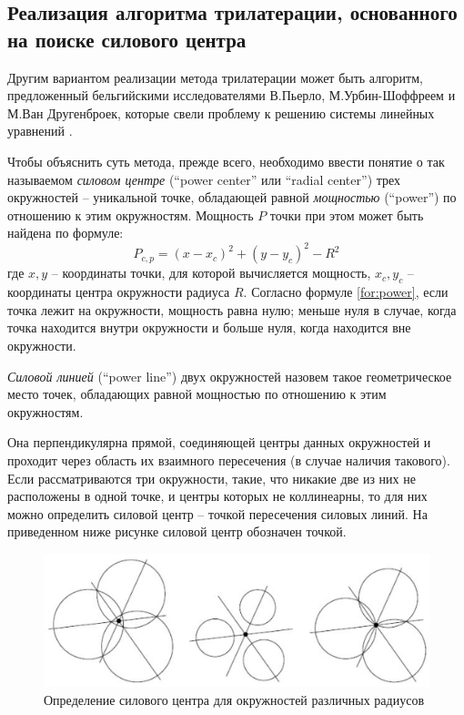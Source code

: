 \subsection{Реализация алгоритма трилатерации, основанного на поиске силового центра}

Другим вариантом реализации метода трилатерации может быть алгоритм, предложенный бельгийскими исследователями В.Пьерло, М.Ур\-бин-Шоф\-фреем и М.Ван Другенброек, которые свели проблему к решению системы линейных уравнений \cite{pierlot2011new}.

Чтобы объяснить суть метода, прежде всего, необходимо ввести понятие о так называемом \textit{силовом центре} (“power center” или “radial center”) трех окружностей – уникальной точке, обладающей равной \textit{мощностью} (“power”) по отношению к этим окружностям. Мощность $P$ точки при этом может быть найдена по формуле:
\begin{equation} \label{for:power}
    P_{c,p} = (x-x_c)^2 + (y-y_c)^2 - R^2
\end{equation}
где ${x, y}$ – координаты точки, для которой вычисляется мощность, ${x_c, y_c}$ – координаты центра окружности радиуса $R$. Согласно формуле \ref{for:power}, если точка лежит на окружности, мощность равна нулю; меньше нуля в случае, когда точка находится внутри окружности и больше нуля, когда находится вне окружности.

\textit{Силовой линией }(“power line”) двух окружностей назовем такое геометрическое место точек, обладающих равной мощностью по отношению к этим окружностям. 

Она перпендикулярна прямой, соединяющей центры данных окружностей и проходит через область их взаимного пересечения (в случае наличия такового). Если рассматриваются три окружности, такие, что никакие две из них не расположены в одной точке, и центры которых не коллинеарны, то для них можно определить силовой центр – точкой пересечения силовых линий. На приведенном ниже рисунке силовой центр обозначен точкой.
\clearpage\newpage
\begin{figure}[t]
    \centering
    \includegraphics[width=\textwidth]{img/powerCenters}
    \caption{Определение силового центра для окружностей различных радиусов}
\end{figure}

